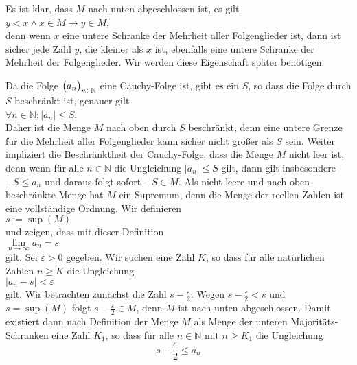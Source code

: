 Es ist klar, dass $M$ nach unten abgeschlossen ist, es gilt 
\\[0.2cm]
\hspace*{1.3cm}
$y < x \wedge x \in M \rightarrow y \in M$,
\\[0.2cm]
denn wenn $x$ eine untere Schranke der Mehrheit aller Folgenglieder ist, dann ist sicher jede Zahl 
$y$, die kleiner als $x$ ist, ebenfalls eine untere Schranke der Mehrheit der Folgenglieder. 
Wir werden diese Eigenschaft sp\"ater ben\"otigen. 

Da die Folge $\bigl(a_n\bigr)_{n\in\mathbb{N}}$ eine Cauchy-Folge ist, gibt es ein $S$, so dass die Folge durch $S$
beschr\"ankt ist, genauer gilt
\\[0.2cm]
\hspace*{1.3cm}
$\forall n \in \mathbb{N}: |a_n| \leq S$.
\\[0.2cm]
Daher ist die Menge $M$ nach oben durch $S$ beschr\"ankt, denn eine untere Grenze f\"ur die Mehrheit
aller Folgenglieder kann sicher nicht gr\"o\ss{}er als $S$ sein.
Weiter impliziert die Beschr\"anktheit der Cauchy-Folge, dass die Menge $M$ nicht leer ist,
denn wenn f\"ur alle $n \in \mathbb{N}$ die Ungleichung $|a_n| \leq S$ gilt,  dann gilt insbesondere
$-S \leq a_n$ und daraus folgt sofort $-S \in M$.  Als nicht-leere und nach oben
beschr\"ankte Menge hat $M$ ein Supremum, denn die Menge der reellen Zahlen ist eine vollst\"andige
Ordnung.  Wir definieren  
\\[0.2cm]
\hspace*{1.3cm}
$s := \sup(M)$
\\[0.2cm]
und zeigen, dass mit dieser Definition
\\[0.2cm]
\hspace*{1.3cm}
$ \lim\limits_{n\rightarrow\infty} a_n = s $
\\[0.2cm]
gilt.  Sei $\varepsilon > 0$ gegeben.  Wir suchen eine Zahl $K$, so dass f\"ur alle 
nat\"urlichen Zahlen $n \geq K$ die Ungleichung
\\[0.2cm]
\hspace*{1.3cm}
$ \bigl|a_n - s \bigr| < \varepsilon $
\\[0.2cm]
gilt.  Wir betrachten zun\"achst die Zahl $s-\frac{\varepsilon}{2}$.  Wegen
$s-\frac{\varepsilon}{2} < s$ und $s = \sup(M)$ folgt $s-\frac{\varepsilon}{2} \in M$, denn $M$
ist nach unten abgeschlossen.  Damit existiert
dann nach Definition der Menge $M$ als Menge der unteren Majorit\"ats-Schranken
eine Zahl $K_1$, so dass f\"ur alle $n\in\mathbb{N}$ mit $n\geq K_1$ die Ungleichung
\begin{equation}
  \label{eq:ineq3}
  s-\frac{\varepsilon}{2} \leq a_n
\end{equation}

